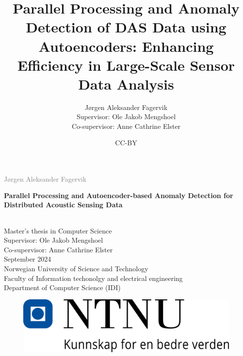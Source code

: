 \documentclass[british]{ntnuthesis}
\title{Parallel Processing and Anomaly Detection of DAS Data using Autoencoders: Enhancing Efficiency in Large-Scale Sensor Data Analysis}
\author{Jørgen Aleksander Fagervik \\
        Supervisor: Ole Jakob Mengshoel \\
        Co-supervisor: Anne Cathrine Elster}
\date{CC-BY \ntnuthesisdate}
\begin{document}
\begin{titlepage}
\vspace*{1.5cm}

\noindent  \textcolor{gray}{\large Jørgen Aleksander Fagervik} \\
\vspace{1cm}

\noindent \textbf{\Large Parallel Processing and Autoencoder-based Anomaly Detection for Distributed Acoustic Sensing Data} \\
\vspace{0.5cm}

 \\



\vspace{7cm}
\noindent Master's thesis in Computer Science \\
Supervisor: Ole Jakob Mengshoel \\
Co-supervisor: Anne Cathrine Elster \\
September 2024 \\

\vspace{0.2cm}
\noindent Norwegian University of Science and Technology \\
Faculty of Information techonolgy and electrical engineering \\
Department of Computer Science (IDI) \\

\begin{figure}[h]
\includegraphics[scale=0.5]{figures/ntnu.png}
\end{figure}
\end{titlepage}
\restoregeometry
\myemptypage 





\tableofcontents
\listoffigures
\listoftables
\lstlistoflistings

\printglossary[type=\acronymtype] %
\printglossary                    %










\chapter*{\bibname}
\printbibliography[heading=none]

\appendix





\end{document}
